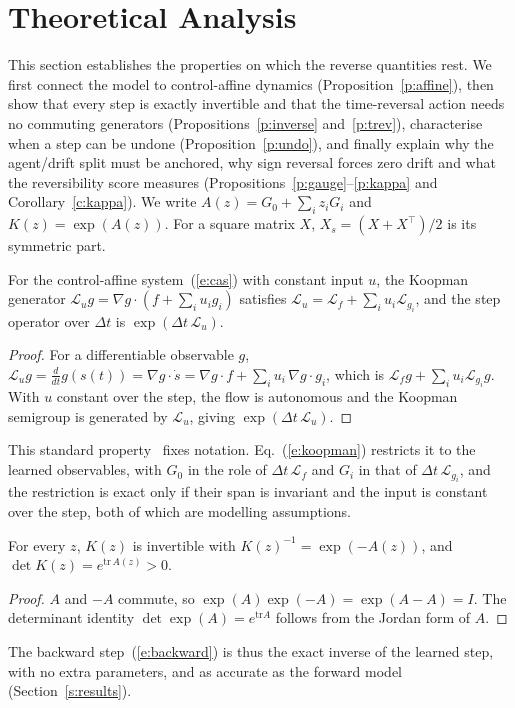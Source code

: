 \documentclass{jcse}
\begin{document}
\section{Theoretical Analysis} \label{s:theory}

This section establishes the properties on which the reverse quantities rest. We first connect the model to control-affine dynamics (Proposition~\ref{p:affine}), then show that every step is exactly invertible and that the time-reversal action needs no commuting generators (Propositions~\ref{p:inverse} and~\ref{p:trev}), characterise when a step can be undone (Proposition~\ref{p:undo}), and finally explain why the agent/drift split must be anchored, why sign reversal forces zero drift and what the reversibility score measures (Propositions~\ref{p:gauge}--\ref{p:kappa} and Corollary~\ref{c:kappa}).
We write $A(z)=G_0+\sum_iz_iG_i$ and $K(z)=\exp(A(z))$.
For a square matrix $X$, $X_s=(X+X^\top)/2$ is its symmetric part.

\begin{proposition}
\label{p:affine}
For the control-affine system~(\ref{e:cas}) with constant input $u$, the Koopman generator $\mathcal{L}_u g=\nabla g\cdot(f+\sum_iu_ig_i)$ satisfies $\mathcal{L}_u=\mathcal{L}_f+\sum_iu_i\mathcal{L}_{g_i}$, and the step operator over $\Delta t$ is $\exp(\Delta t\,\mathcal{L}_u)$.
\end{proposition}
\begin{proof}
For a differentiable observable $g$, $\mathcal{L}_ug=\frac{d}{dt}g(s(t))=\nabla g\cdot\dot s=\nabla g\cdot f+\sum_iu_i\,\nabla g\cdot g_i$, which is $\mathcal{L}_fg+\sum_iu_i\mathcal{L}_{g_i}g$.
With $u$ constant over the step, the flow is autonomous and the Koopman semigroup is generated by $\mathcal{L}_u$, giving $\exp(\Delta t\,\mathcal{L}_u)$.
\end{proof}
This standard property~\cite{goswami2017global,bruder2021bilinear} fixes notation. Eq.~(\ref{e:koopman}) restricts it to the learned observables, with $G_0$ in the role of $\Delta t\,\mathcal{L}_f$ and $G_i$ in that of $\Delta t\,\mathcal{L}_{g_i}$, and the restriction is exact only if their span is invariant and the input is constant over the step, both of which are modelling assumptions.

\begin{proposition}
\label{p:inverse}
For every $z$, $K(z)$ is invertible with $K(z)^{-1}=\exp(-A(z))$, and $\det K(z)=e^{\mathrm{tr}\,A(z)}>0$.
\end{proposition}
\begin{proof}
$A$ and $-A$ commute, so $\exp(A)\exp(-A)=\exp(A-A)=I$.
The determinant identity $\det\exp(A)=e^{\mathrm{tr}A}$ follows from the Jordan form of $A$.
\end{proof}
The backward step~(\ref{e:backward}) is thus the exact inverse of the learned step, with no extra parameters, and as accurate as the forward model (Section~\ref{s:results}).
\end{document}

